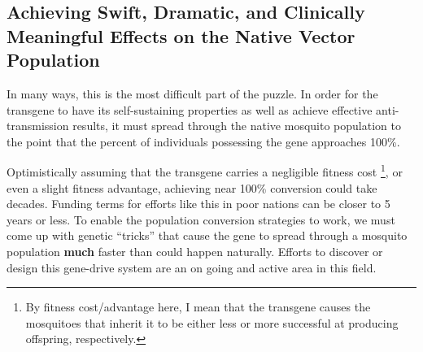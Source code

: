 \subsection{Achieving Swift, Dramatic, and Clinically Meaningful Effects on the Native Vector Population}

In many ways, this is the most difficult part of the puzzle.
In order for the transgene to have its self-sustaining properties as well as achieve effective anti-transmission results, it must spread through the native mosquito population to the point that the percent of individuals possessing the gene approaches 100\%.

Optimistically assuming that the transgene carries a negligible fitness cost
\footnote{By fitness cost/advantage here, I mean that the transgene
    causes the mosquitoes that inherit it to be either less or more
    successful at producing offspring, respectively.},
or even a slight fitness advantage, achieving near 100\% conversion could take decades.
Funding terms for efforts like this in poor nations can be closer to 5 years or less.
To enable the population conversion strategies to work, we must come up with genetic ``tricks'' that cause the gene to spread through a mosquito population \textbf{much} faster than could happen naturally.
Efforts to discover or design this \gls{gene-drive} system are an on going and active area in this field.





